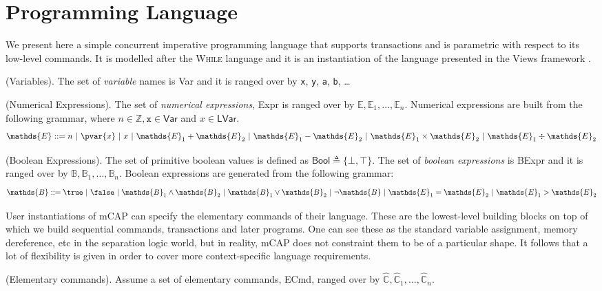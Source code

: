 \section{Programming Language}
\label{language}

We present here a simple concurrent imperative programming language that supports transactions and is parametric with respect to its low-level commands. It is modelled after the \textsc{While} language and it is an instantiation of the language presented in the Views framework \cite{views}.

\begin{defn}
	(Variables).
	The set of \emph{variable} names is \textsf{Var} and it is ranged over by \texttt{x}, \texttt{y}, \texttt{a}, \texttt{b}, \ldots
\end{defn}

\begin{defn}
	(Numerical Expressions).
	The set of \emph{numerical expressions}, \textsf{Expr} is ranged over by $\mathds{E}, \mathds{E}_1, \ldots, \mathds{E}_n$. Numerical expressions are built from the following grammar, where $n \in \mathds{Z}, \mathtt{x} \in \mathsf{Var}$ and $x \in \mathsf{LVar}$.
	\[
		\mathds{E} ::=
			n\
			|\ \pvar{x}\
			|\ x\
			|\ \mathds{E}_1 + \mathds{E}_2\
			|\ \mathds{E}_1 - \mathds{E}_2\
			|\ \mathds{E}_1 \times \mathds{E}_2\
			|\ \mathds{E}_1 \div \mathds{E}_2
	\]
\end{defn}

\begin{defn}
	(Boolean Expressions).
	The set of primitive boolean values is defined as $\mathsf{Bool} \triangleq \{ \bot, \top \}$. The set of \emph{boolean expressions} is \textsf{BExpr} and it is ranged over by $\mathds{B}, \mathds{B}_1, \ldots, \mathds{B}_n$. Boolean expressions are generated from the following grammar:
	\[
		\mathds{B} ::=
			\true\
			|\ \false\
			|\ \mathds{B}_1 \land \mathds{B}_2\
			|\ \mathds{B}_1 \lor \mathds{B}_2\
			|\ \lnot \mathds{B}\
			|\ \mathds{E}_1 = \mathds{E}_2\
			|\ \mathds{E}_1 > \mathds{E}_2
	\]
\end{defn}

User instantiations of mCAP can specify the elementary commands of their language. These are the lowest-level building blocks on top of which we build sequential commands, transactions and later programs. One can see these as the standard variable assignment, memory dereference, etc in the separation logic world, but in reality, mCAP does not constraint them to be of a particular shape. It follows that a lot of flexibility is given in order to cover more context-specific language requirements.
\begin{param}
	\label{param:ecmd}
	(Elementary commands).
	Assume a set of elementary commands, \textsf{ECmd}, ranged over by $\hat{\mathds{C}}, \hat{\mathds{C}}_1, \ldots, \hat{\mathds{C}}_n$.
\end{param}


